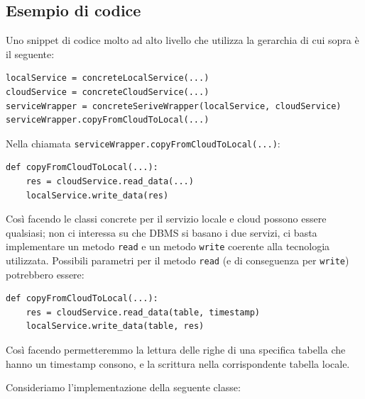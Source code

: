 \documentclass[a4paper]{article}
\begin{document}
\subsection{Esempio di codice}

Uno snippet di codice molto ad alto livello che utilizza la gerarchia di cui
sopra è il seguente:
\begin{lstlisting}
localService = concreteLocalService(...)
cloudService = concreteCloudService(...)
serviceWrapper = concreteSeriveWrapper(localService, cloudService)
serviceWrapper.copyFromCloudToLocal(...)
\end{lstlisting}
Nella chiamata \texttt{serviceWrapper.copyFromCloudToLocal(...)}:
\begin{lstlisting}
def copyFromCloudToLocal(...):
    res = cloudService.read_data(...)
    localService.write_data(res)
\end{lstlisting}
Così facendo le classi concrete per il servizio locale e cloud possono essere
qualsiasi; non ci interessa su che DBMS si basano i due servizi, ci basta
implementare un metodo \texttt{read} e un metodo \texttt{write} coerente alla
tecnologia utilizzata. Possibili parametri per il metodo \texttt{read} (e
di conseguenza per \texttt{write}) potrebbero essere:
\begin{lstlisting}
def copyFromCloudToLocal(...):
    res = cloudService.read_data(table, timestamp)
    localService.write_data(table, res)
\end{lstlisting}
Così facendo permetteremmo la lettura delle righe di una specifica tabella che
hanno un timestamp consono, e la scrittura nella corrispondente tabella locale.

Consideriamo l'implementazione della seguente classe:
\end{document}
